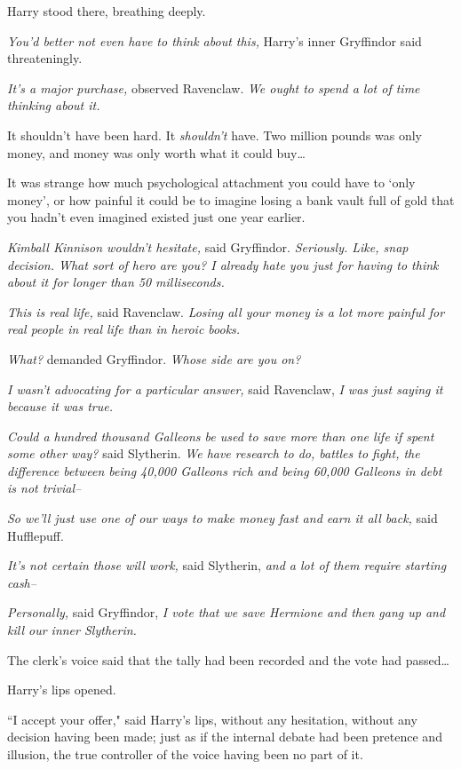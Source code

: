 Harry stood there, breathing deeply.

\emph{You'd better not even have to think about this,} Harry's inner Gryffindor said threateningly.

\emph{It's a major purchase,} observed Ravenclaw. \emph{We ought to spend a lot of time thinking about it.}

It shouldn't have been hard. It \emph{shouldn't} have. Two million pounds was only money, and money was only worth what it could buy{\ldots}

It was strange how much psychological attachment you could have to `only money', or how painful it could be to imagine losing a bank vault full of gold that you hadn't even imagined existed just one year earlier.

\emph{Kimball Kinnison wouldn't hesitate,} said Gryffindor. \emph{Seriously. Like, snap decision. What sort of hero are you? I already hate you just for having to think about it for longer than 50 milliseconds.}

\emph{This is real life,} said Ravenclaw. \emph{Losing all your money is a lot more painful for real people in real life than in heroic books.}

\emph{What?} demanded Gryffindor. \emph{Whose side are you on?}

\emph{I wasn't advocating for a particular answer,} said Ravenclaw, \emph{I was just saying it because it was true.}

\emph{Could a hundred thousand Galleons be used to save more than one life if spent some other way?} said Slytherin. \emph{We have research to do, battles to fight, the difference between being 40,000 Galleons rich and being 60,000 Galleons in debt is not trivial\---}

\emph{So we'll just use one of our ways to make money fast and earn it all back,} said Hufflepuff.

\emph{It's not certain those will work,} said Slytherin, \emph{and a lot of them require starting cash\---}

\emph{Personally,} said Gryffindor, \emph{I vote that we save Hermione and then gang up and kill our inner Slytherin.}

The clerk's voice said that the tally had been recorded and the vote had passed{\ldots}

Harry's lips opened.

``I accept your offer," said Harry's lips, without any hesitation, without any decision having been made; just as if the internal debate had been pretence and illusion, the true controller of the voice having been no part of it.


